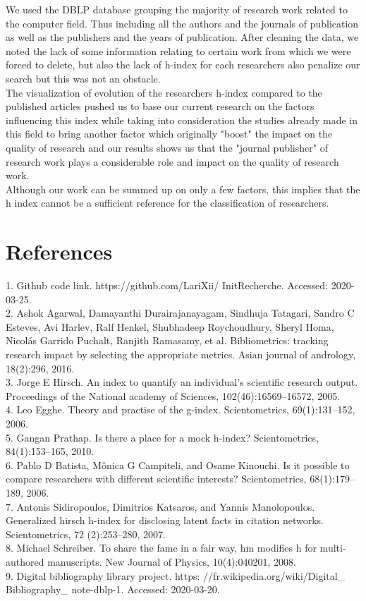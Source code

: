 \documentclass[times, twoside]{zHenriquesLab-StyleBioRxiv}
\begin{document}
We used the DBLP database grouping the majority of research work related to the computer field. Thus including all the authors and the journals of publication as well as the publishers and the years of publication. After cleaning the data, we noted the lack of some information relating to certain work from which we were forced to delete, but also the lack of h-index for each researchers also penalize our search but this was not an obstacle.\\

The visualization of evolution of the researchers h-index compared to the published articles pushed us to base our current research on the factors influencing this index while taking into consideration the studies already made in this field to bring another factor which originally "boost" the impact on the quality of research and our results shows us that the "journal publisher" of research work plays a considerable role and impact on the quality of research work.\\

Although our work can be summed up on only a few factors, this implies that the h index cannot be a sufficient reference for the classification of researchers.
\section*{References}
1. Github code link. https://github.com/LariXii/
InitRecherche. Accessed: 2020-03-25.\\
2. Ashok Agarwal, Damayanthi Durairajanayagam, Sindhuja
Tatagari, Sandro C Esteves, Avi Harlev, Ralf
Henkel, Shubhadeep Roychoudhury, Sheryl Homa,
Nicolás Garrido Puchalt, Ranjith Ramasamy, et al. Bibliometrics:
tracking research impact by selecting the appropriate
metrics. Asian journal of andrology, 18(2):296,
2016.\\
3. Jorge E Hirsch. An index to quantify an individual’s
scientific research output. Proceedings of the National
academy of Sciences, 102(46):16569–16572, 2005.\\
4. Leo Egghe. Theory and practise of the g-index. Scientometrics,
69(1):131–152, 2006.\\
5. Gangan Prathap. Is there a place for a mock h-index?
Scientometrics, 84(1):153–165, 2010.\\
6. Pablo D Batista, Mônica G Campiteli, and Osame Kinouchi.
Is it possible to compare researchers with different
scientific interests? Scientometrics, 68(1):179–189,
2006.\\
7. Antonis Sidiropoulos, Dimitrios Katsaros, and Yannis
Manolopoulos. Generalized hirsch h-index for disclosing
latent facts in citation networks. Scientometrics, 72
(2):253–280, 2007.\\
8. Michael Schreiber. To share the fame in a fair way, hm
modifies h for multi-authored manuscripts. New Journal
of Physics, 10(4):040201, 2008.\\
9. Digital bibliography library project. https:
//fr.wikipedia.org/wiki/Digital_
Bibliography_%
note-dblp-1. Accessed: 2020-03-20.
\\
\end{document}
